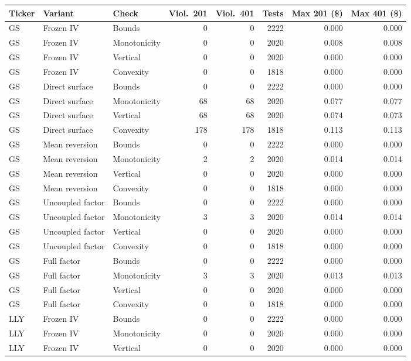 \begin{tabular}{lllrrrrr}
\toprule
Ticker & Variant & Check & Viol.\ 201 & Viol.\ 401 & Tests & Max 201 (\$) & Max 401 (\$) \\
\midrule
GS & Frozen IV & Bounds & 0 & 0 & 2222 & 0.000 & 0.000 \\
GS & Frozen IV & Monotonicity & 0 & 0 & 2020 & 0.008 & 0.008 \\
GS & Frozen IV & Vertical & 0 & 0 & 2020 & 0.000 & 0.000 \\
GS & Frozen IV & Convexity & 0 & 0 & 1818 & 0.000 & 0.000 \\
GS & Direct surface & Bounds & 0 & 0 & 2222 & 0.000 & 0.000 \\
GS & Direct surface & Monotonicity & 68 & 68 & 2020 & 0.077 & 0.077 \\
GS & Direct surface & Vertical & 68 & 68 & 2020 & 0.074 & 0.073 \\
GS & Direct surface & Convexity & 178 & 178 & 1818 & 0.113 & 0.113 \\
GS & Mean reversion & Bounds & 0 & 0 & 2222 & 0.000 & 0.000 \\
GS & Mean reversion & Monotonicity & 2 & 2 & 2020 & 0.014 & 0.014 \\
GS & Mean reversion & Vertical & 0 & 0 & 2020 & 0.000 & 0.000 \\
GS & Mean reversion & Convexity & 0 & 0 & 1818 & 0.000 & 0.000 \\
GS & Uncoupled factor & Bounds & 0 & 0 & 2222 & 0.000 & 0.000 \\
GS & Uncoupled factor & Monotonicity & 3 & 3 & 2020 & 0.014 & 0.014 \\
GS & Uncoupled factor & Vertical & 0 & 0 & 2020 & 0.000 & 0.000 \\
GS & Uncoupled factor & Convexity & 0 & 0 & 1818 & 0.000 & 0.000 \\
GS & Full factor & Bounds & 0 & 0 & 2222 & 0.000 & 0.000 \\
GS & Full factor & Monotonicity & 3 & 3 & 2020 & 0.013 & 0.013 \\
GS & Full factor & Vertical & 0 & 0 & 2020 & 0.000 & 0.000 \\
GS & Full factor & Convexity & 0 & 0 & 1818 & 0.000 & 0.000 \\
LLY & Frozen IV & Bounds & 0 & 0 & 2222 & 0.000 & 0.000 \\
LLY & Frozen IV & Monotonicity & 0 & 0 & 2020 & 0.000 & 0.000 \\
LLY & Frozen IV & Vertical & 0 & 0 & 2020 & 0.000 & 0.000 \\

\end{tabular}
